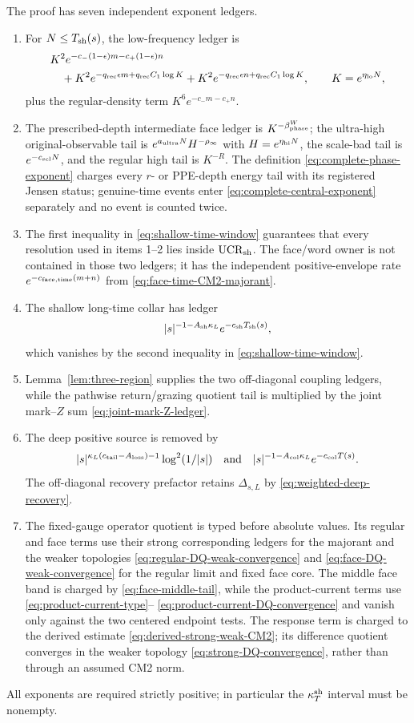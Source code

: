 \documentclass[11pt]{article}
\begin{document}
The proof has seven independent exponent ledgers.
\begin{enumerate}[label=\textup{(A\arabic*)}]
\item For $N\le T_{\rm sh}(s)$, the low-frequency ledger is
\begin{align*}
 &K^2e^{-c_-(1-\epsilon)m-c_+(1-\epsilon)n}\\
 &\quad+K^2e^{-q_{\rm rec}\epsilon m+q_{\rm rec}C_1\log K}
 +K^2e^{-q_{\rm rec}\epsilon n+q_{\rm rec}C_1\log K},
 \qquad K=e^{\eta_{\rm lo}N},
\end{align*}
plus the regular-density term $K^6e^{-c_-m-c_+n}$.
\item The prescribed-depth intermediate face ledger is
$K^{-\beta_{\rm phase}^{W}}$; the ultra-high original-observable tail is
$e^{a_{\rm ultra}N}H^{-\rho_\infty}$ with
$H=e^{\eta_{\rm hi}N}$, the scale-bad tail is $e^{-c_{\rm scl}N}$, and the
regular high tail is $K^{-R}$.  The definition
\eqref{eq:complete-phase-exponent} charges every $r$- or PPE-depth energy
tail with its registered Jensen status; genuine-time events enter
\eqref{eq:complete-central-exponent} separately and no event is counted
twice.
\item The first inequality in \eqref{eq:shallow-time-window} guarantees
that every resolution used in items 1--2 lies inside
$\mathrm{UCR}_{\rm sh}$.
The face/word owner is not contained in those two ledgers; it has the
independent positive-envelope rate
$e^{-c_{\rm face,time}(m+n)}$ from
\eqref{eq:face-time-CM2-majorant}.
\item The shallow long-time collar has ledger
\[
 |s|^{-1-A_{\rm sh}\kappa_L}
 e^{-c_{\rm sh}T_{\rm sh}(s)},
\]
which vanishes by the second inequality in
\eqref{eq:shallow-time-window}.
\item Lemma~\ref{lem:three-region} supplies the two off-diagonal coupling
ledgers, while the pathwise return/grazing quotient tail is multiplied by
the joint mark--$Z$ sum \eqref{eq:joint-mark-Z-ledger}.
\item The deep positive source is removed by
\[
 |s|^{\kappa_L(c_{\rm tail}-A_{\rm loss})-1}\log^2(1/|s|)
 \quad\hbox{and}\quad
 |s|^{-1-A_{\rm col}\kappa_L}e^{-c_{\rm col}T(s)}.
\]
The off-diagonal recovery prefactor retains $\Delta_{s,L}$ by
\eqref{eq:weighted-deep-recovery}.
\item The fixed-gauge operator quotient is typed before absolute values.  Its
regular and face terms use their strong corresponding ledgers for the
majorant and the weaker topologies
\eqref{eq:regular-DQ-weak-convergence} and
\eqref{eq:face-DQ-weak-convergence} for the regular limit and fixed face
core.  The middle face band is charged by
\eqref{eq:face-middle-tail}, while the
product-current terms use \eqref{eq:product-current-type}--
\eqref{eq:product-current-DQ-convergence} and vanish only against the two
centered endpoint tests.  The response term is charged to the derived estimate
\eqref{eq:derived-strong-weak-CM2}; its difference quotient converges in the
weaker topology \eqref{eq:strong-DQ-convergence}, rather than through an
assumed CM2 norm.
\end{enumerate}
All exponents are required strictly positive; in particular the
$\kappa_T^{\rm sh}$ interval must be nonempty.
\end{document}
